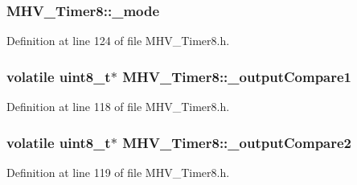 \hypertarget{class_m_h_v___timer8_a6f6b063d32d0778e8d1a91c561c79f13}{
\subsubsection[{\-\_\-mode}]{ {\bf \-M\-H\-V\-\_\-\-Timer8\-::\-\_\-mode}}}
\label{class_m_h_v___timer8_a6f6b063d32d0778e8d1a91c561c79f13}


\-Definition at line 124 of file \-M\-H\-V\-\_\-\-Timer8.\-h.

\hypertarget{class_m_h_v___timer8_ab69320fb8fee00da797099aa633fdd92}{
\subsubsection[{\-\_\-output\-Compare1}]{\setlength{\rightskip}{0pt plus 5cm}volatile uint8\-\_\-t$\ast$ {\bf \-M\-H\-V\-\_\-\-Timer8\-::\-\_\-output\-Compare1}}}
\label{class_m_h_v___timer8_ab69320fb8fee00da797099aa633fdd92}


\-Definition at line 118 of file \-M\-H\-V\-\_\-\-Timer8.\-h.

\hypertarget{class_m_h_v___timer8_a81be7741280c03ccfa31d22a20b5609b}{
\subsubsection[{\-\_\-output\-Compare2}]{\setlength{\rightskip}{0pt plus 5cm}volatile uint8\-\_\-t$\ast$ {\bf \-M\-H\-V\-\_\-\-Timer8\-::\-\_\-output\-Compare2}}}
\label{class_m_h_v___timer8_a81be7741280c03ccfa31d22a20b5609b}


\-Definition at line 119 of file \-M\-H\-V\-\_\-\-Timer8.\-h.

